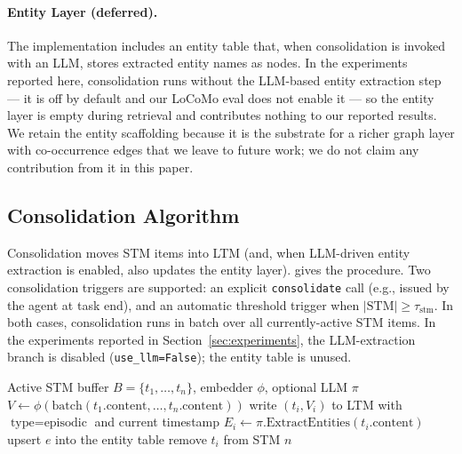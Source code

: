 \paragraph{Entity Layer (deferred).} The implementation includes an entity table that, when consolidation is invoked with an LLM, stores extracted entity names as nodes. In the experiments reported here, consolidation runs without the LLM-based entity extraction step --- it is off by default and our LoCoMo eval does not enable it --- so the entity layer is empty during retrieval and contributes nothing to our reported results. We retain the entity scaffolding because it is the substrate for a richer graph layer with co-occurrence edges that we leave to future work; we do not claim any contribution from it in this paper.

\subsection{Consolidation Algorithm}
\label{sec:method-consol}

Consolidation moves STM items into LTM (and, when LLM-driven entity extraction is enabled, also updates the entity layer).  gives the procedure. Two consolidation triggers are supported: an explicit \texttt{consolidate} call (e.g., issued by the agent at task end), and an automatic threshold trigger when $|\text{STM}| \geq \tau_{\text{stm}}$. In both cases, consolidation runs in batch over all currently-active STM items. In the experiments reported in Section~\ref{sec:experiments}, the LLM-extraction branch is disabled (\texttt{use\_llm=False}); the entity table is unused.

\begin{algorithm}[t]
\caption{STM~$\rightarrow$~LTM Consolidation}
\label{alg:consolidate}
\begin{algorithmic}[1]
\Require Active STM buffer $B = \{t_1, \dots, t_n\}$, embedder $\phi$, optional LLM $\pi$
\State $V \gets \phi(\text{batch}(t_1.\text{content}, \dots, t_n.\text{content}))$ 
    \State write $(t_i, V_i)$ to LTM with $\text{type}{=}\text{episodic}$ and current timestamp
        \State $E_i \gets \pi.\text{ExtractEntities}(t_i.\text{content})$
            \State upsert $e$ into the entity table
        \EndFor
    \EndIf
    \State remove $t_i$ from STM
\EndFor
\State \Return $n$
\end{algorithmic}
\end{algorithm}

